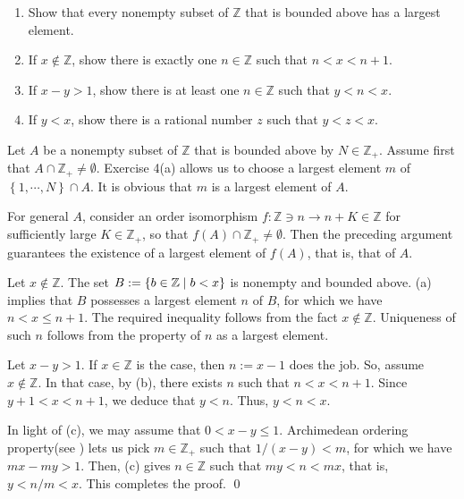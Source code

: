 \documentclass[a4paper,12pt]{article}
\begin{document}
\begin{exe}\leavevmode \par
	\begin{enumerate}
		\item
		      Show that every nonempty subset of \( \mathbb{Z} \) that is bounded above has a largest element.
		      
		\item
		      If \( x\notin \mathbb{Z} \),
		      show there is exactly one \( n \in \mathbb{Z} \) such that \( n<x<n+1 \).
		      
		\item
		      If \( x-y>1 \),
		      show there is at least one \( n \in \mathbb{Z} \) such that \( y<n<x \).
		      
		\item
		      If \( y<x \),
		      show there is a rational number \( z \) such that \( y<z<x \).
	\end{enumerate}
\end{exe}\begin{sol}\leavevmode \par
	Let
	\( A \) be a nonempty subset of \( \mathbb{Z} \)
	that is bounded above by \( N \in \mathbb{Z}_{+} \).
	Assume first that \( A \cap \mathbb{Z}_{+} \neq \emptyset \).
	Exercise 4(a) allows us to choose a largest element \( m \) of
	\( \left\{ 1,\cdots, N \right\} \cap A \).
	It is obvious that \( m \) is a largest element of \( A \).
	
	For general \( A \),
	consider an order isomorphism
	\( f:\mathbb{Z} \ni n \to n +K \in \mathbb{Z} \)
	for sufficiently large \( K \in \mathbb{Z}_{+} \),
	so that \( f(A) \cap \mathbb{Z}_{+} \neq \emptyset \).
	Then the preceding argument guarantees
	the existence of a largest element of \( f(A) \),
	that is, that of \( A\).
	
	Let 
	\( x \notin \mathbb{Z} \).
	The set 
	\( B:=\left\{ b \in \mathbb{Z} \;|\; b <x \right\} \)
	is nonempty and bounded above.
	(a) implies that
	\( B \) possesses a largest element
	\( n \)
	of
	\( B \),
	for which we have
	\( n< x \le n+1 \).
	The required inequality follows from the fact
	\( x \notin \mathbb{Z} \).
	Uniqueness of such
	\( n \)
	follows from the property of 
	\( n \)
	as a largest element.
	
	Let
	\( x-y>1 \).
	If
	\(  x \in \mathbb{Z} \)
	is the case,
	then
	\( n:=x-1 \)
	does the job.
	So, assume
	\(  x \notin \mathbb{Z} \).
	In that case, by (b),
	there exists
	\( n \)
	such that
	\( n<x<n+1 \).
	Since
	\( y+1<x<n+1 \),
	we deduce that
	\( y<n \).
	Thus,
	\( y<n<x \).
	
	In light of (c),
	we may assume that
	\( 0 < x-y \le 1 \).
	Archimedean ordering property(see ) lets us pick
	\( m\in \mathbb{Z}_{+} \)
	such that
	\( 1/(x-y) < m \),
	for which we have
	\( mx-my>1 \).
	Then, (c) gives
	\( n \in \mathbb{Z} \)
	such that 
	\( my< n< mx \),
	that is,
	\( y<n/m<x \).
	This completes the proof.
	\qed\end{sol}
\end{document}

